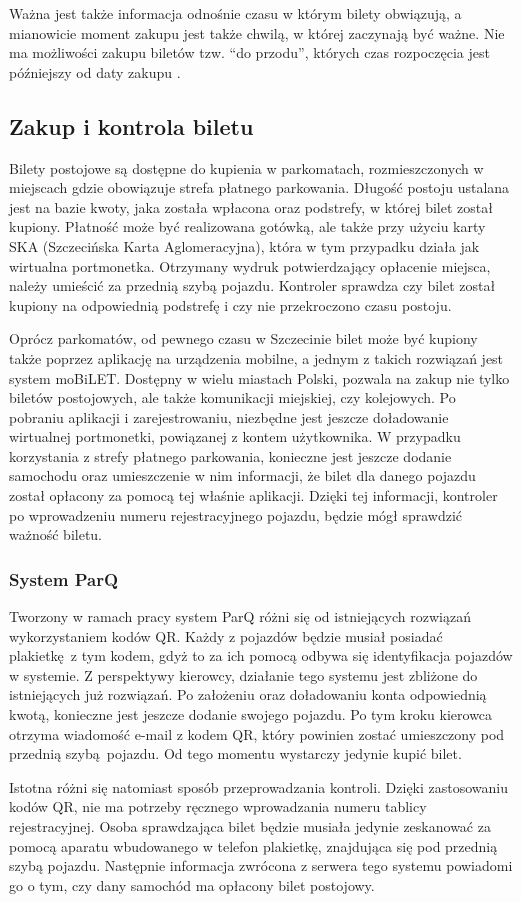 Ważna jest także informacja odnośnie czasu w którym bilety obwiązują, a mianowicie moment zakupu jest także chwilą, w której zaczynają być ważne. Nie ma możliwości zakupu biletów tzw. ``do przodu'', których czas rozpoczęcia jest późniejszy od daty zakupu \cite{sumowanie}. 

\subsection{Zakup i kontrola biletu}

Bilety postojowe są dostępne do kupienia w parkomatach, rozmieszczonych w miejscach gdzie obowiązuje strefa płatnego parkowania. Długość postoju ustalana jest na bazie kwoty, jaka została wpłacona oraz podstrefy, w której bilet został kupiony. Płatność może być realizowana gotówką, ale także przy użyciu karty SKA (Szczecińska Karta Aglomeracyjna), która w tym przypadku działa jak wirtualna portmonetka. Otrzymany wydruk potwierdzający opłacenie miejsca, należy umieścić za przednią szybą pojazdu. Kontroler sprawdza czy bilet został kupiony na odpowiednią podstrefę i czy nie przekroczono czasu postoju.

Oprócz parkomatów, od pewnego czasu w Szczecinie bilet może być kupiony także poprzez aplikację na urządzenia mobilne, a jednym z takich rozwiązań jest system moBiLET. Dostępny w wielu miastach Polski, pozwala na zakup nie tylko biletów postojowych, ale także komunikacji miejskiej, czy kolejowych. Po pobraniu aplikacji i zarejestrowaniu, niezbędne jest jeszcze doładowanie wirtualnej portmonetki, powiązanej z kontem użytkownika. W przypadku korzystania z strefy płatnego parkowania, konieczne jest jeszcze dodanie samochodu oraz umieszczenie w nim informacji, że bilet dla danego pojazdu został opłacony za pomocą tej właśnie aplikacji. Dzięki tej informacji, kontroler po wprowadzeniu numeru rejestracyjnego pojazdu, będzie mógł sprawdzić ważność biletu.

\subsubsection*{System ParQ}

Tworzony w ramach pracy system ParQ różni się od istniejących rozwiązań wykorzystaniem kodów QR. Każdy z pojazdów będzie musiał posiadać plakietkę z tym kodem, gdyż to za ich pomocą odbywa się identyfikacja pojazdów w systemie. Z perspektywy kierowcy, działanie tego systemu jest zbliżone do istniejących już rozwiązań. Po założeniu oraz doładowaniu konta odpowiednią kwotą, konieczne jest jeszcze dodanie swojego pojazdu. Po tym kroku kierowca otrzyma wiadomość e-mail z kodem QR, który powinien zostać umieszczony pod przednią szybą pojazdu. Od tego momentu wystarczy jedynie kupić bilet. 

Istotna różni się natomiast sposób przeprowadzania kontroli. Dzięki zastosowaniu kodów QR, nie ma potrzeby ręcznego wprowadzania numeru tablicy rejestracyjnej. Osoba sprawdzająca bilet będzie musiała jedynie zeskanować za pomocą aparatu wbudowanego w telefon plakietkę, znajdująca się pod przednią szybą pojazdu. Następnie informacja zwrócona z serwera tego systemu powiadomi go o tym, czy dany samochód ma opłacony bilet postojowy.